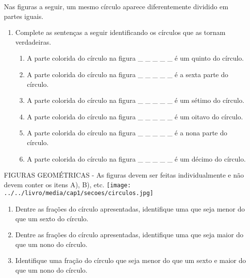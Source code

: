 \documentclass[a4paper,12pt,twoside]{book}
\begin{document}
Nas figuras a seguir, um mesmo círculo aparece diferentemente dividido em partes iguais. 
\begin{enumerate} [\quad a)] %
  \item     Complete as sentenças a seguir identificando os círculos que as tornam verdadeiras.     
\begin{enumerate} [\quad I)] %
      \item        	A parte colorida do círculo na figura \_ \_ \_ \_ \_ é um quinto do círculo.
      \item        	A parte colorida do círculo na figura \_ \_ \_ \_ \_ é a sexta parte do círculo.
      \item        	A parte colorida do círculo na figura \_ \_ \_ \_ \_ é um sétimo do círculo.
      \item        	A parte colorida do círculo na figura \_ \_ \_ \_ \_ é um oitavo do círculo.
      \item        	A parte colorida do círculo na figura \_ \_ \_ \_ \_ é a nona parte do círculo.
      \item        	A parte colorida do círculo na figura \_ \_ \_ \_ \_ é um décimo do círculo.        \mbox{} \newline          
\end{enumerate} %

\end{enumerate} %
\begin{imagem*}[breakable]{}{}   FIGURAS GEOMÉTRICAS - As figuras devem ser feitas individualmente e não devem conter os itens A), B), etc.  
    \texttt{[image: ../../livro/media/cap1/secoes/circulos.jpg]}  
\end{imagem*}\mbox{} \newline 
\begin{enumerate} [\quad a)] %
  \item     Dentre as frações do círculo apresentadas, identifique uma que seja menor do que um sexto do círculo.
  \item     Dentre as frações do círculo apresentadas, identifique uma que seja maior do que um nono do círculo.
  \item     Identifique uma fração do círculo que seja menor do que um sexto e maior do que um nono do círculo.
\end{enumerate} %
\end{document}
